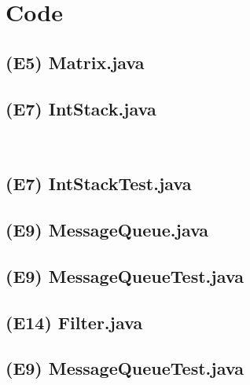 \documentclass[main.tex]{subfiles}
\begin{document}
\section*{Code}

\subsection*{(E5) Matrix.java}


\newpage
\subsection*{(E7) IntStack.java}

\\  
\subsection*{(E7) IntStackTest.java}


\newpage
\subsection*{(E9) MessageQueue.java}


\newpage
\subsection*{(E9) MessageQueueTest.java}



\newpage
\subsection*{(E14) Filter.java}


\newpage
\subsection*{(E9) MessageQueueTest.java}

\end{document}
